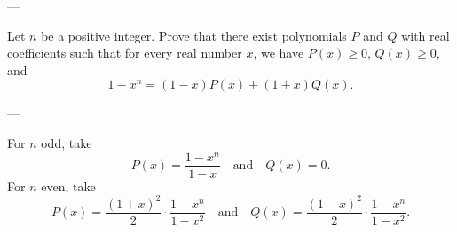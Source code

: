 
---

Let $n$ be a positive integer. Prove that there exist polynomials $P$ and $Q$ with real coefficients such that for every real number $x$, we have $P(x)\ge0$, $Q(x)\ge0$, and \[1-x^n=(1-x)P(x)+(1+x)Q(x).\]

---

For $n$ odd, take \[P(x)=\frac{1-x^n}{1-x}\quad\text{and}\quad Q(x)=0.\]
For $n$ even, take \[P(x)=\frac{(1+x)^2}2\cdot\frac{1-x^n}{1-x^2}\quad\text{and}\quad Q(x)=\frac{(1-x)^2}2\cdot\frac{1-x^n}{1-x^2}.\]

